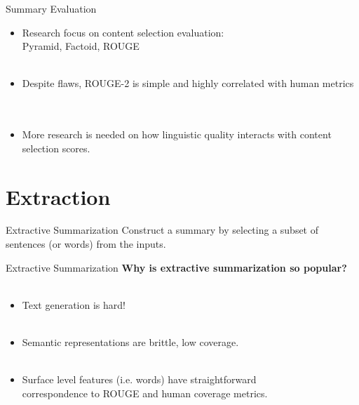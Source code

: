 \documentclass[xcolor={table}]{beamer}
\newcommand\conit[1]{\item[\textcolor{conc}{$-$}] \textcolor{conc}{#1}}
\newcommand\proit[1]{\item[\textcolor{proc}{$+$}] \textcolor{proc}{#1}}
\newcommand\spit{\hspace{\labelwidth}}
\begin{document}
\begin{frame}{Summary Evaluation}

    \begin{itemize}
        \item Research focus on content selection evaluation: \\
            Pyramid, Factoid, ROUGE
            ~\\~\\
        \proit{Despite flaws, ROUGE-2 is simple and highly correlated with 
            human metrics}
            ~\\~\\
        \conit{More research is needed on how linguistic quality interacts 
            with content selection scores.}
    \end{itemize}

\end{frame}


\section{Extraction}


\begin{frame}{Extractive Summarization}
    Construct a summary by selecting a subset of sentences (or words) from 
    the inputs.
\end{frame}

\begin{frame}{Extractive Summarization}
  \textbf{Why is extractive summarization so popular?}\\
  ~\\
  \begin{itemize}
    \item Text generation is hard!
    ~\\~\\    
    \item Semantic representations are brittle, low coverage. 
    ~\\~\\
    \item Surface level features (i.e. words) have straightforward \\
           \spit correspondence to ROUGE and human coverage metrics.
    \end{itemize}
\end{frame}
\end{document}
